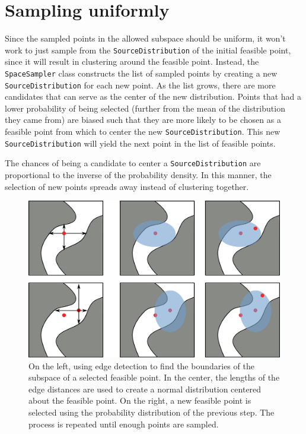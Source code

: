 \documentclass[12pt, fleqn]{article}
\newcommand{\code}[1]{\texttt{#1}}
\begin{document}
\section{Sampling uniformly}
Since the sampled points in the allowed subspace should be uniform, it won't work to just sample from the \code{SourceDistribution} of the initial feasible point, since it will result in clustering around the feasible point.
Instead, the \code{SpaceSampler} class constructs the list of sampled points by creating a new \code{SourceDistribution} for each new point.
As the list grows, there are more candidates that can serve as the center of the new distribution.
Points that had a lower probability of being selected (further from the mean of the distribution they came from) are biased such that they are more likely to be chosen as a feasible point from which to center the new \code{SourceDistribution}.
This new \code{SourceDistribution} will yield the next point in the list of feasible points.

The chances of being a candidate to center a \code{SourceDistribution} are proportional to the inverse of the probability density.
In this manner, the selection of new points spreads away instead of clustering together.

\begin{figure}[h]
    \begin{center}
        \includegraphics[width=\linewidth]{./detection_sampling.pdf}
        \caption{On the left, using edge detection to find the boundaries of the subspace of a selected feasible point.
        In the center, the lengths of the edge distances are used to create a normal distribution centered about the feasible point.
    On the right, a new feasible point is selected using the probability distribution of the previous step.
The process is repeated until enough points are sampled.}
    \end{center}
\end{figure}
\end{document}
